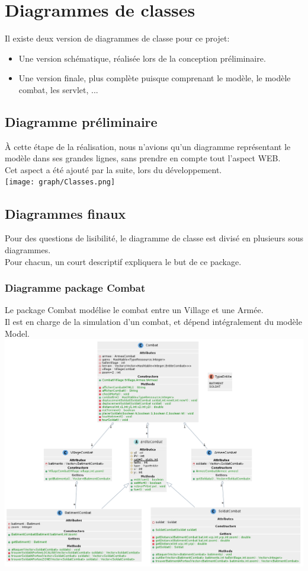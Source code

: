 \chapter{Diagrammes de classes}
    Il existe deux version de diagrammes de classe pour ce projet:
    \begin{itemize}
        \item Une version schématique, réalisée lors de la conception préliminaire.
        \item Une version finale, plus complète puisque comprenant le modèle, le modèle combat, les servlet, ...
    \end{itemize}
    \section{Diagramme préliminaire}
        À cette étape de la réalisation, nous n'avions qu'un diagramme représentant le modèle dans ses grandes lignes, sans prendre en compte tout l'aspect WEB.\\
        Cet aspect a été ajouté par la suite, lors du développement.\\

        \texttt{[image: graph/Classes.png]}
    \section{Diagrammes finaux}
        Pour des questions de lisibilité, le diagramme de classe est divisé en plusieurs sous diagrammes.\\
        Pour chacun, un court descriptif expliquera le but de ce package.
        \subsection{Diagramme package Combat}
            Le package Combat modélise le combat entre un Village et une Armée.\\
            Il est en charge de la simulation d'un combat, et dépend intégralement du modèle Model.\\

            \includegraphics[scale=0.4]{ressources/images/ClassesCombat.png}
